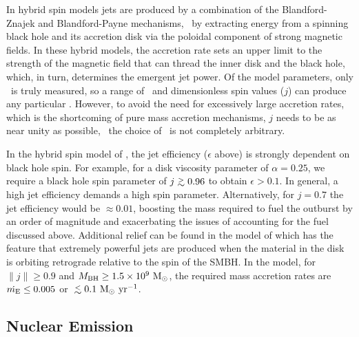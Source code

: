 \documentclass[iop]{emulateapj}
\begin{document}
In hybrid spin models \citep[\eg][]{1999ApJ...522..753M,
  2001ApJ...548L...9M, 2006ApJ...651.1023R, 2007MNRAS.377.1652N,
  2009MNRAS.397.1302B, gesspin} jets are produced by a combination of
the Blandford-Znajek \citep{bz} and Blandford-Payne \citep{bp}
mechanisms, \ie\ by extracting energy from a spinning black hole and
its accretion disk via the poloidal component of strong magnetic
fields. In these hybrid models, the accretion rate sets an upper limit
to the strength of the magnetic field that can thread the inner disk
and the black hole, which, in turn, determines the emergent jet
power. Of the model parameters, only \pjet\ is truly measured, so a
range of \dme\ and dimensionless spin values ($j$) can produce any
particular \pjet. However, to avoid the need for excessively large
accretion rates, which is the shortcoming of pure mass accretion
mechanisms, $j$ needs to be as near unity as possible, \ie\ the choice
of \dme\ is not completely arbitrary.

In the hybrid spin model of \citet{2007MNRAS.377.1652N}, the jet
efficiency ($\epsilon$ above) is strongly dependent on black hole
spin. For example, for a disk viscosity parameter of $\alpha = 0.25$,
we require a black hole spin parameter of $j \ga 0.96$ to obtain
$\epsilon > 0.1$. In general, a high jet efficiency demands a high
spin parameter. Alternatively, for $j = 0.7$ the jet efficiency would
be $\approx 0.01$, boosting the mass required to fuel the outburst by
an order of magnitude and exacerbating the issues of accounting for
the fuel discussed above. Additional relief can be found in the model
of \citet{gesspin} which has the feature that extremely powerful jets
are produced when the material in the disk is orbiting retrograde
relative to the spin of the SMBH. In the \citet{gesspin} model, for
$\|j\| \ge 0.9$ and $M_{\rm{BH}} \ge 1.5 \times 10^9 ~\rm{M_{\odot}}$, the required
mass accretion rates are $\dot{m_{\rm{E}}} \le 0.005$ or $\la 0.1 ~\msolpy$.

\subsection{Nuclear Emission}
\label{sec:nuc}
\end{document}
